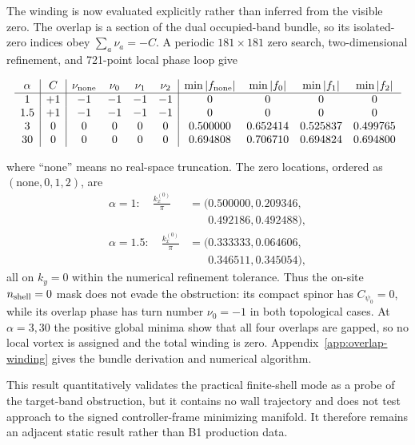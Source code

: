 \documentclass[aps,prx,twocolumn,floatfix,nofootinbib,superscriptaddress,longbibliography]{revtex4-2}
\begin{document}
The winding is now evaluated explicitly rather than inferred from the visible zero.  The
overlap is a section of the dual occupied-band bundle, so its isolated-zero indices obey
$\sum_a\nu_a=-C$.  A periodic $181\times181$ zero search, two-dimensional refinement,
and 721-point local phase loop give
\begin{widetext}
\begin{equation}
\begin{array}{c|c|cccc|cccc}
\alpha&C&\nu_{\rm none}&\nu_0&\nu_1&\nu_2&
\min|f_{\rm none}|&\min|f_0|&\min|f_1|&\min|f_2|\\ \hline
1   &+1&-1&-1&-1&-1&0&0&0&0\\
1.5 &+1&-1&-1&-1&-1&0&0&0&0\\
3   &0&0&0&0&0&0.500000&0.652414&0.525837&0.499765\\
30  &0&0&0&0&0&0.694808&0.706710&0.694824&0.694800
\end{array}
\label{eq:b1-overlap-winding-sweep}
\end{equation}
\end{widetext}
where ``none'' means no real-space truncation.  The zero locations, ordered as
$(\mathrm{none},0,1,2)$, are
\begin{equation}
 \begin{aligned}
 \alpha=1:\quad
 \frac{k_x^{(0)}}{\pi}&=(0.500000,0.209346,\\
                       &\phantom{{}=(}0.492186,0.492488),\\
 \alpha=1.5:\quad
 \frac{k_x^{(0)}}{\pi}&=(0.333333,0.064606,\\
                       &\phantom{{}=(}0.346511,0.345054),
 \end{aligned}
 \label{eq:b1-overlap-zero-locations}
\end{equation}
all on $k_y=0$ within the numerical refinement tolerance.  Thus the on-site
$n_{\rm shell}=0$ mask does not evade the obstruction: its compact spinor has
$C_{\psi_0}=0$, while its overlap phase has turn number $\nu_0=-1$ in both topological
cases.  At $\alpha=3,30$ the positive global minima show that all four overlaps are
gapped, so no local vortex is assigned and
the total winding is zero.  Appendix~\ref{app:overlap-winding} gives the bundle derivation
and numerical algorithm.

This result quantitatively validates the practical finite-shell mode as a
probe of the target-band obstruction, but it contains no wall trajectory and does not test
approach to the signed controller-frame minimizing manifold.  It therefore remains an
adjacent static result rather than B1 production data.
\end{document}
